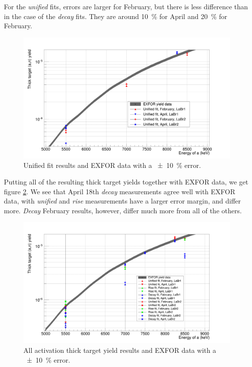 \documentclass[a4paper,12pt]{report}
\begin{document}
For the \textit{unified} fits, errors are larger for February, but there is less difference than in the case of the \textit{decay} fits.
They are around \qty{10}{\percent} for April and \qty{20}{\percent} for February.

\begin{figure}[H]
	\centering
	\includegraphics[width=\textwidth]{reactions_v_energy_unified.png}
	\caption{Unified fit results and EXFOR data with a \qty{\pm 10}{\percent} error.}
	\label{reactions_v_energy_unified}
\end{figure}

Putting all of the resulting thick target yields together with EXFOR data, we get figure \ref{reactions_v_energy}.
We see that April 18th \textit{decay} measurements agree well with EXFOR data, with \textit{unified} and \textit{rise} measurements have a larger error margin, and differ more.
\textit{Decay} February results, however, differ much more from all of the others.

\begin{figure}[H]
	\centering
	\includegraphics[width=\textwidth]{reactions_v_energy.png}
	\caption{All activation thick target yield results and EXFOR data with a \qty{\pm 10}{\percent} error.}
	\label{reactions_v_energy}
\end{figure}
\end{document}
